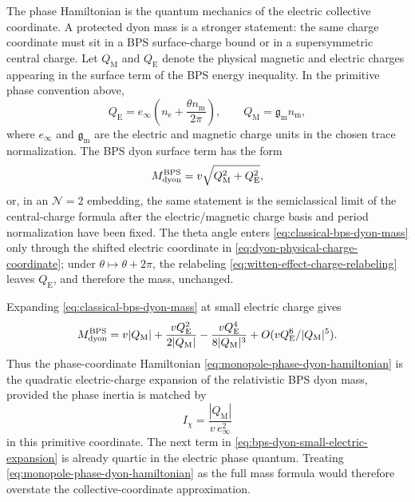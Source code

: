 \begin{controlledapproximation}
\label{ca:monopole-phase-bps-dyon-mass}
The phase Hamiltonian is the quantum mechanics of the electric collective
coordinate.  A protected dyon mass is a stronger statement: the same charge
coordinate must sit in a BPS surface-charge bound or in a supersymmetric
central charge.  Let \(Q_{\mathrm M}\) and \(Q_{\mathrm E}\) denote the
physical magnetic and electric charges appearing in the surface term of the
BPS energy inequality.  In the primitive phase convention above,
\begin{equation}
  Q_{\mathrm E}
  =
  e_\infty
  \left(
    n_{\mathrm e}
    +
    \frac{\theta n_{\mathrm m}}{2\pi}
  \right),
  \qquad
  Q_{\mathrm M}=\mathfrak g_{\mathrm m}n_{\mathrm m},
  \label{eq:dyon-physical-charge-coordinate}
\end{equation}
where \(e_\infty\) and \(\mathfrak g_{\mathrm m}\) are the electric and
magnetic charge units in the chosen trace normalization.  The BPS dyon
surface term has the form
\begin{equation}
  M_{\rm dyon}^{\rm BPS}
  =
  v\sqrt{Q_{\mathrm M}^2+Q_{\mathrm E}^2},
  \label{eq:classical-bps-dyon-mass}
\end{equation}
or, in an \(\mathcal N=2\) embedding, the same statement is the semiclassical
limit of the central-charge formula after the electric/magnetic charge basis
and period normalization have been fixed.  The theta angle enters
\eqref{eq:classical-bps-dyon-mass} only through the shifted electric
coordinate in \eqref{eq:dyon-physical-charge-coordinate}; under
\(\theta\mapsto\theta+2\pi\), the relabeling
\eqref{eq:witten-effect-charge-relabeling} leaves \(Q_{\mathrm E}\), and
therefore the mass, unchanged.

Expanding \eqref{eq:classical-bps-dyon-mass} at small electric charge gives
\begin{equation}
  M_{\rm dyon}^{\rm BPS}
  =
  v|Q_{\mathrm M}|
  +
  \frac{vQ_{\mathrm E}^2}{2|Q_{\mathrm M}|}
  -
  \frac{vQ_{\mathrm E}^4}{8|Q_{\mathrm M}|^3}
  +O(vQ_{\mathrm E}^6/|Q_{\mathrm M}|^5).
  \label{eq:bps-dyon-small-electric-expansion}
\end{equation}
Thus the phase-coordinate Hamiltonian
\eqref{eq:monopole-phase-dyon-hamiltonian} is the quadratic electric-charge
expansion of the relativistic BPS dyon mass, provided the phase inertia is
matched by
\begin{equation}
  I_\chi
  =
  \frac{|Q_{\mathrm M}|}{v\,e_\infty^2}
  \label{eq:dyon-phase-inertia-bps-match}
\end{equation}
in this primitive coordinate.  The next term in
\eqref{eq:bps-dyon-small-electric-expansion} is already quartic in the
electric phase quantum.  Treating
\eqref{eq:monopole-phase-dyon-hamiltonian} as the full mass formula would
therefore overstate the collective-coordinate approximation.


\end{controlledapproximation}
